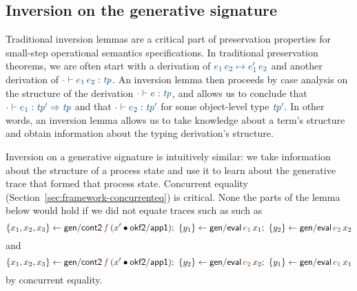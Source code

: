 \subsection{Inversion on the generative signature}

Traditional inversion lemmas are a critical part of preservation
properties for small-step operational semantics specifications. In 
traditional preservation theorems, we are often start with a derivation of
$\obj{e_1\,e_2 \mapsto e_1'\,e_2}$ and another derivation of
$\obj{\cdot \vdash e_1\,e_2 : {\it tp}}$. An inversion lemma then proceeds
by case analysis on the structure of the derivation 
$\obj{\cdot \vdash e : {\it tp}}$, and allows us to conclude that
$\obj{\cdot \vdash e_1 : {\it tp'} \Rightarrow {\it tp}}$
and that $\obj{\cdot \vdash e_2 : {\it tp'} }$ for some object-level
type $\obj{\it tp'}$.  In other words, an inversion lemma allows us to 
take knowledge about a term's structure and obtain information about 
the typing derivation's structure. 

Inversion on a generative signature is intuitively similar: we take
information about the structure of a process state and use it to learn
about the generative trace that formed that process state. Concurrent
equality (Section~\ref{sec:framework-concurrenteq}) is critical.
None the parts of the lemma below would hold if we did not
equate traces such as such as
\[
\trstep{x_1, x_2, x_3}{{\sf gen/cont2}\,\lf{f}\,(x' \fuse {\sf okf2/app1})}; ~
\trstep{y_1}{{\sf gen/eval}\,\lf{e_1}\,x_1}; ~
\trstep{y_2}{{\sf gen/eval}\,\lf{e_2}\,x_2}
\]and\[
\trstep{x_1, x_2, x_3}{{\sf gen/cont2}\,\lf{f}\,(x' \fuse {\sf okf2/app1})}; ~
\trstep{y_2}{{\sf gen/eval}\,\lf{e_2}\,x_2}; ~
\trstep{y_1}{{\sf gen/eval}\,\lf{e_1}\,x_1}
\]
by concurrent equality.

